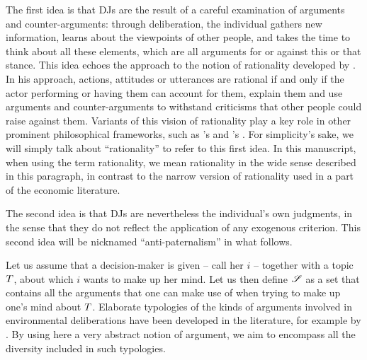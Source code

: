 \documentclass[version=3.21, pagesize, twoside=off, bibliography=totoc, DIV=calc, fontsize=12pt, a4paper, french, english]{scrartcl}
\begin{document}
The first idea is that \acp{DJ} are the result of a careful examination of arguments and counter-arguments: through deliberation, the individual gathers new information, learns about the viewpoints of other people, and takes the time to think about all these elements, 
which are all arguments for or against this or that stance. 
This idea echoes the approach to the notion of rationality developed by \citet{habermas_theorie_1981}.
In his approach, actions, attitudes or utterances are rational if and only if the actor performing or having them can account for them, explain them and use arguments and counter-arguments to withstand criticisms that other people could raise against them. 
Variants of this vision of rationality play a key role in other prominent philosophical frameworks, such as \citeauthor{scanlon_what_2000}’s \citeyearpar{scanlon_what_2000} and \citeauthor{sen_idea_2009}’s \citeyearpar{sen_idea_2009}. 
For simplicity's sake, we will simply talk about ``rationality'' to refer to this first idea.%
In this manuscript, when using the term rationality, we mean rationality in the wide sense described in this paragraph, in contrast to the narrow version of rationality used in a part of the economic literature.

The second idea is that \acp{DJ} are nevertheless the individual's own judgments, in the sense that they do not reflect the application of any exogenous criterion. 
This second idea will be nicknamed ``anti-paternalism'' in what follows. 

Let us assume that a decision-maker is given -- call her $i$ -- together with a topic $T$, about which $i$ wants to make up her mind. 
Let us then define $\mathscr{S}$ as a set that contains all the arguments that one can make use of when trying to make up one’s mind about $T$.
Elaborate typologies of the kinds of arguments involved in environmental deliberations have been developed in the literature, for example by \citet{chateauraynaud_contrainte_2007}. 
By using here a very abstract notion of argument, we aim to encompass all the diversity included in such typologies. 
\end{document}
